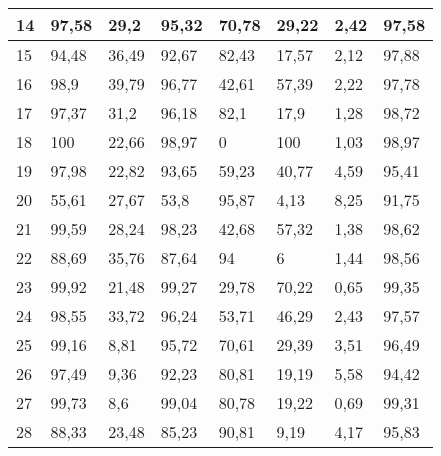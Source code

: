 \begin{longtable}[c]{|l|l|l|l|l|l|l|l|}
14              & 97,58        & 29,2         & 95,32       & 70,78         & 29,22         & 2,42          & 97,58         \\ \hline
15              & 94,48        & 36,49        & 92,67       & 82,43         & 17,57         & 2,12          & 97,88         \\ \hline
16              & 98,9         & 39,79        & 96,77       & 42,61         & 57,39         & 2,22          & 97,78         \\ \hline
17              & 97,37        & 31,2         & 96,18       & 82,1          & 17,9          & 1,28          & 98,72         \\ \hline
18              & 100          & 22,66        & 98,97       & 0             & 100           & 1,03          & 98,97         \\ \hline
19              & 97,98        & 22,82        & 93,65       & 59,23         & 40,77         & 4,59          & 95,41         \\ \hline
20              & 55,61        & 27,67        & 53,8        & 95,87         & 4,13          & 8,25          & 91,75         \\ \hline
21              & 99,59        & 28,24        & 98,23       & 42,68         & 57,32         & 1,38          & 98,62         \\ \hline
22              & 88,69        & 35,76        & 87,64       & 94            & 6             & 1,44          & 98,56         \\ \hline
23              & 99,92        & 21,48        & 99,27       & 29,78         & 70,22         & 0,65          & 99,35         \\ \hline
24              & 98,55        & 33,72        & 96,24       & 53,71         & 46,29         & 2,43          & 97,57         \\ \hline
25              & 99,16        & 8,81         & 95,72       & 70,61         & 29,39         & 3,51          & 96,49         \\ \hline
26              & 97,49        & 9,36         & 92,23       & 80,81         & 19,19         & 5,58          & 94,42         \\ \hline
27              & 99,73        & 8,6          & 99,04       & 80,78         & 19,22         & 0,69          & 99,31         \\ \hline
28              & 88,33        & 23,48        & 85,23       & 90,81         & 9,19          & 4,17          & 95,83         \\ \hline

\end{longtable}
